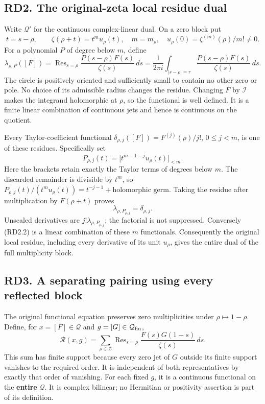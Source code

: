 \subsection{RD2. The original-zeta local residue
dual}\label{rd2.-the-original-zeta-local-residue-dual}

Write \(\mathcal Q'\) for the continuous complex-linear dual. On a zero
block put \[
t=s-\rho,\qquad \zeta(\rho+t)=t^m u_\rho(t),\quad
m=m_\rho,\quad u_\rho(0)=\zeta^{(m)}(\rho)/m!\ne0.
\tag{RD2.1}
\] For a polynomial \(P\) of degree below \(m\), define \[
\lambda_{\rho,P}([F])
=\operatorname{Res}_{s=\rho}\frac{P(s-\rho)F(s)}{\zeta(s)}\,ds
=\frac1{2\pi i}\int_{|s-\rho|=r}
\frac{P(s-\rho)F(s)}{\zeta(s)}\,ds.
\tag{RD2.2}
\] The circle is positively oriented and sufficiently small to contain
no other zero or pole. No choice of its admissible radius changes the
residue. Changing \(F\) by \(\mathcal I\) makes the integrand
holomorphic at \(\rho\), so the functional is well defined. It is a
finite linear combination of continuous jets and hence is continuous on
the quotient.

Every Taylor-coefficient functional
\(\delta_{\rho,j}([F])=F^{(j)}(\rho)/j!\), \(0\le j<m\), is one of these
residues. Specifically set \[
P_{\rho,j}(t)=\bigl[t^{m-1-j}u_\rho(t)\bigr]_{<m}.
\tag{RD2.3}
\] Here the brackets retain exactly the Taylor terms of degrees below
\(m\). The discarded remainder is divisible by \(t^m\), so
\(P_{\rho,j}(t)/(t^m u_\rho(t))=t^{-j-1}+\text{holomorphic germ}\).
Taking the residue after multiplication by \(F(\rho+t)\) proves \[
\lambda_{\rho,P_{\rho,j}}=\delta_{\rho,j}.
\tag{RD2.4}
\] Unscaled derivatives are \(j!\lambda_{\rho,P_{\rho,j}}\); the
factorial is not suppressed. Conversely (RD2.2) is a linear combination
of these \(m\) functionals. Consequently the original local residue,
including every derivative of its unit \(u_\rho\), gives the entire dual
of the full multiplicity block.

\subsection{RD3. A separating pairing using every reflected
block}\label{rd3.-a-separating-pairing-using-every-reflected-block}

The original functional equation preserves zero multiplicities under
\(\rho\mapsto1-\rho\). Define, for \(x=[F]\in\mathcal Q\) and
\(g=[G]\in\mathcal Q_{\rm fin}\), \[
\mathcal R(x,g)=\sum_{\rho\in\mathscr Z}
\operatorname{Res}_{s=\rho}\frac{F(s)G(1-s)}{\zeta(s)}\,ds.
\tag{RD3.1}
\] This sum has finite support because every zero jet of \(G\) outside
its finite support vanishes to the required order. It is independent of
both representatives by exactly that order of vanishing. For each fixed
\(g\), it is a continuous functional on the \textbf{entire}
\(\mathcal Q\). It is complex bilinear; no Hermitian or positivity
assertion is part of its definition.

